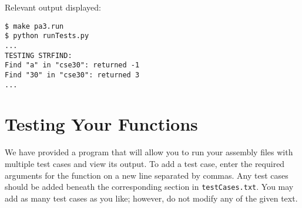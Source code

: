 \documentclass{article}
\begin{document}
\noindent  Relevant output displayed:
\begin{verbatim}
$ make pa3.run
$ python runTests.py 
...
TESTING STRFIND:
Find "a" in "cse30": returned -1
Find "30" in "cse30": returned 3
...
\end{verbatim}

\section{Testing Your Functions}
We have provided a program that will allow you to run your assembly files with multiple test cases and view its output. To add a test case, enter the required arguments for the function on a new line separated by commas. Any test cases should be added  beneath the corresponding section in  {\tt testCases.txt}. You may add as many test cases as you like; however, do not modify any of the given text. \newline
\end{document}
